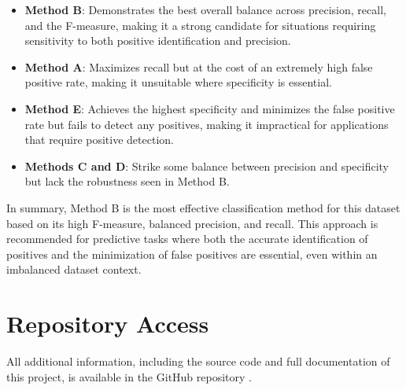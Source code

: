 \documentclass{article}
\begin{document}
\begin{itemize}
	\item \textbf{Method B}: Demonstrates the best overall balance across precision, recall, and the F-measure, making it a strong candidate for situations requiring sensitivity to both positive identification and precision.
	\item \textbf{Method A}: Maximizes recall but at the cost of an extremely high false positive rate, making it unsuitable where specificity is essential.
	\item \textbf{Method E}: Achieves the highest specificity and minimizes the false positive rate but fails to detect any positives, making it impractical for applications that require positive detection.
	\item \textbf{Methods C and D}: Strike some balance between precision and specificity but lack the robustness seen in Method B.
\end{itemize}


In summary, Method B is the most effective classification method for this dataset based on its high F-measure, balanced precision, and recall. This approach is recommended for predictive tasks where both the accurate identification of positives and the minimization of false positives are essential, even within an imbalanced dataset context.


\section{Repository Access}

All additional information, including the source code and full documentation of this project, is available in the GitHub repository \cite{cuevas2024github}.


\end{document}
